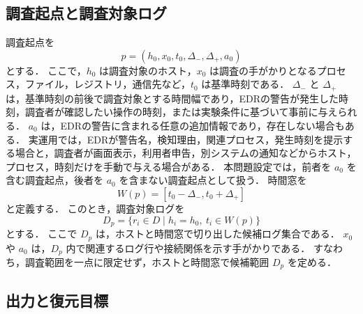 \documentclass[a4paper,twocolumn,10pt]{article}
\begin{document}
\subsection{調査起点と調査対象ログ}

調査起点を
\[
p=(h_0,x_0,t_0,\Delta_-,\Delta_+,a_0)
\]
とする．
ここで，\(h_0\) は調査対象のホスト，\(x_0\) は調査の手がかりとなるプロセス，ファイル，レジストリ，通信先など，\(t_0\) は基準時刻である．
\(\Delta_-\) と \(\Delta_+\) は，基準時刻の前後で調査対象とする時間幅であり，EDRの警告が発生した時刻，調査者が確認したい操作の時刻，または実験条件に基づいて事前に与えられる．
\(a_0\) は，EDRの警告に含まれる任意の追加情報であり，存在しない場合もある．
実運用では，EDRが警告名，検知理由，関連プロセス，発生時刻を提示する場合と，調査者が画面表示，利用者申告，別システムの通知などからホスト，プロセス，時刻だけを手動で与える場合がある．
本問題設定では，前者を \(a_0\) を含む調査起点，後者を \(a_0\) を含まない調査起点として扱う．
時間窓を
\[
W(p)=[t_0-\Delta_-,t_0+\Delta_+]
\]
と定義する．
このとき，調査対象ログを
\[
D_p=\{r_i\in D \mid h_i=h_0,\ t_i\in W(p)\}
\]
とする．
ここで \(D_p\) は，ホストと時間窓で切り出した候補ログ集合である．
\(x_0\) や \(a_0\) は，\(D_p\) 内で関連するログ行や接続関係を示す手がかりである．
すなわち，調査範囲を一点に限定せず，ホストと時間窓で候補範囲 \(D_p\) を定める．

\subsection{出力と復元目標}
\end{document}
